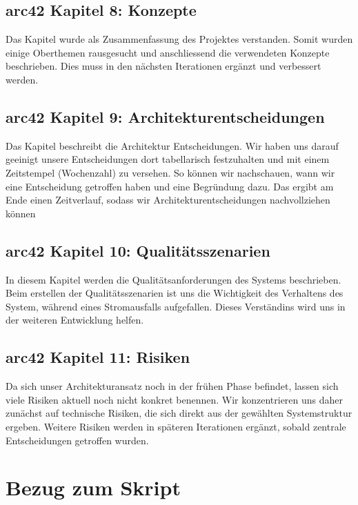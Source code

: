 \documentclass{article}
\begin{document}
\subsection{arc42 Kapitel 8: Konzepte}
Das Kapitel wurde als Zusammenfassung des Projektes verstanden. Somit wurden einige Oberthemen rausgesucht und anschliessend die verwendeten Konzepte beschrieben. Dies muss in den nächsten Iterationen ergänzt und verbessert werden.

\subsection{arc42 Kapitel 9: Architekturentscheidungen}
Das Kapitel  beschreibt die Architektur Entscheidungen. Wir haben uns darauf geeinigt unsere Entscheidungen dort tabellarisch festzuhalten und mit einem Zeitstempel (Wochenzahl) zu versehen. So können wir nachschauen, wann wir eine Entscheidung getroffen haben und eine Begründung dazu. Das ergibt am Ende einen Zeitverlauf, sodass wir Architekturentscheidungen nachvollziehen können

\subsection{arc42 Kapitel 10: Qualitätsszenarien}
In diesem Kapitel werden die Qualitätsanforderungen des Systems beschrieben. Beim erstellen der Qualitätsszenarien ist uns die Wichtigkeit des Verhaltens des System, während eines Stromausfalls aufgefallen. Dieses Verständins wird uns in der weiteren Entwicklung helfen. 

\subsection{arc42 Kapitel 11: Risiken}
Da sich unser Architekturansatz noch in der frühen Phase befindet, lassen sich viele Risiken aktuell noch nicht konkret benennen.
Wir konzentrieren uns daher zunächst auf technische Risiken, die sich direkt aus der gewählten Systemstruktur ergeben. Weitere Risiken werden in späteren Iterationen ergänzt, sobald zentrale Entscheidungen getroffen wurden.

\section{Bezug zum Skript}
\end{document}
